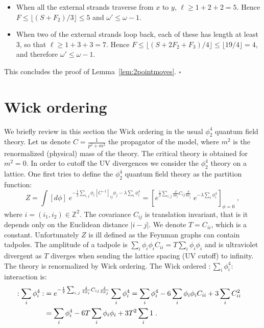 \documentclass[10pt]{article}
\theoremstyle{plain}
\theoremstyle{definition}
\begin{document}
\begin{itemize}
\item When all the external strands traverse from $x$ to $y$, $\ell \geq 1+2+2 = 5$. Hence $F \leq \lfloor (S + F_2 )/3 \rfloor \leq 5$ and $\omega' \leq \omega-1$.

\item When two of the external strands loop back, each of these has length at least $3$, so that $\ell \geq 1+3+3 = 7$. Hence $F \leq \lfloor ( S + 2 F_2 + F_3) /4 \rfloor \leq \lfloor 19/4 \rfloor = 4$, and therefore $\omega' \leq \omega - 1$. 

\end{itemize}

This concludes the proof of Lemma~\ref{lem:2pointmoves}. \hfill $\square$

\section{Wick ordering}

We briefly review in this section the Wick ordering in the usual $\phi^4_2$ quantum field theory. Let us denote $C = \frac{1}{p^2 + m^2}$ the propagator of the model, where $m^2$ is the renormalized (physical) mass 
of the theory. The critical theory is obtained for $m^2=0$. In order to cutoff the UV divergences we consider the $\phi^4_2$ theory on a lattice. 
One first tries to define the $\phi^4_2$ quantum  field theory as the partition function:
\[
 Z = \int [d\phi] \; e^{-\frac{1}{2} \sum_{i,j} \phi_i [C^{-1}]_{ij} \phi_j -\lambda \sum_i \phi_i^4  }  =
 \left[  e^{ \frac{1}{2} \sum_{i,j} \frac{\delta}{\delta \phi_i}  C_{ij}  \frac{\delta}{\delta \phi_j} }  \;e^{-\lambda \sum_i \phi_i^4} \right]_{\phi=0} \;,
\]
where $i = (i_1,i_2) \in  \mathbb{Z}^2$. The covariance $C_{ij}$ is translation invariant, that is it depends only on the Euclidean distance $|i-j|$.
We denote $T = C_{ii}$, which is a constant. 
Unfortunately $Z$ is ill defined as the Feynman graphs can contain tadpoles. The amplitude of a tadpole is $\sum_i \phi_i \phi_i C_{ii} =  T  \sum_i \phi_i \phi_i$ 
and is ultraviolet divergent as $T $ diverges when sending the lattice spacing (UV cutoff) to infinity. 
The theory is renormalized by Wick ordering. The Wick ordered $: \sum_i \phi_i^4 :$ interaction is:
\begin{align*}
 : \sum_i \phi_i^4 : &  = e^{ - \frac{1}{2} \sum_{i,j} \frac{\delta}{\delta \phi_i}  C_{ij}  \frac{\delta}{\delta \phi_j} } \sum_i \phi_i^4  
  = \sum_i \phi_i^4 - 6     \sum_i \phi_i \phi_i C_{ii}   + 3  \sum_i C_{ii}^2  \crcr
 &   =  \sum_i \phi_i^4 - 6 T \sum_i \phi_i \phi_i   + 3 T^2\sum_i 1 \;.
\end{align*}
\end{document}
